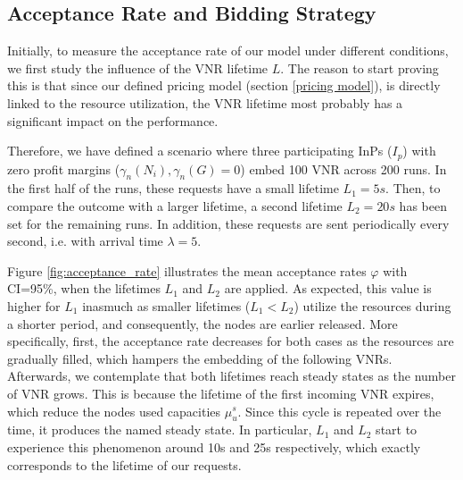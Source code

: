\subsection{Acceptance Rate and Bidding Strategy}

Initially, to measure the acceptance rate of our model under different conditions, we first study the influence of the VNR lifetime $L$. The reason to start proving this is that since our defined pricing model (section \ref{pricing model}), is directly linked to the resource utilization, the VNR lifetime most probably has a significant impact on the performance.

Therefore, we have defined a scenario where three participating InPs ($I_p$) with zero profit margins ($\gamma_n(N_i),\gamma_n(G) = 0$) embed 100 VNR across 200 runs. In the first half of the runs, these requests have a small lifetime $L_1 = 5s$. Then, to compare the outcome with a larger lifetime, a second lifetime $L_2=20s$ has been set for the remaining runs. In addition, these requests are sent periodically every second, i.e. with arrival time $\lambda = 5$.

Figure \ref{fig:acceptance_rate} illustrates the mean acceptance rates $\varphi$ with CI=95\%, when the lifetimes $L_1$ and $L_2$ are applied. As expected, this value is higher for $L_1$ inasmuch as smaller lifetimes ($L_1 < L_2$) utilize the resources during a shorter period, and consequently, the nodes are earlier released. More specifically, first, the acceptance rate decreases for both cases as the resources are gradually filled, which hampers the embedding of the following VNRs. Afterwards, we contemplate that both lifetimes reach steady states as the number of VNR grows. This is because the lifetime of the first incoming VNR expires, which reduce the nodes used capacities $\mu^s_u$. Since this cycle is repeated over the time, it produces the named steady state. In particular, $L_1$ and $L_2$ start to experience this phenomenon around 10s and 25s respectively, which exactly corresponds to the lifetime of our requests.

